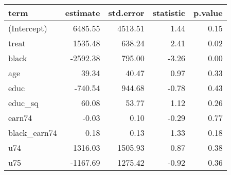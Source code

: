 \begin{tabular}{lrrrr}
  \hline
term & estimate & std.error & statistic & p.value \\ 
  \hline
(Intercept) & 6485.55 & 4513.51 & 1.44 & 0.15 \\ 
  treat & 1535.48 & 638.24 & 2.41 & 0.02 \\ 
  black & -2592.38 & 795.00 & -3.26 & 0.00 \\ 
  age & 39.34 & 40.47 & 0.97 & 0.33 \\ 
  educ & -740.54 & 944.68 & -0.78 & 0.43 \\ 
  educ\_sq & 60.08 & 53.77 & 1.12 & 0.26 \\ 
  earn74 & -0.03 & 0.10 & -0.29 & 0.77 \\ 
  black\_earn74 & 0.18 & 0.13 & 1.33 & 0.18 \\ 
  u74 & 1316.03 & 1505.93 & 0.87 & 0.38 \\ 
  u75 & -1167.69 & 1275.42 & -0.92 & 0.36 \\ 
   \hline
\end{tabular}

